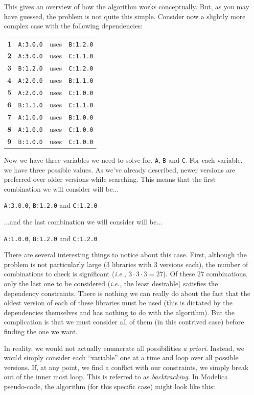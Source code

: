 \documentclass[11pt,a4paper,twocolumn]{article}
\renewcommand{\small}{\fontsize{9.5pt}{11.1pt}\selectfont}
\newcommand{\code}[1]{\texttt{#1}} %
\begin{document}
This gives an overview of how the algorithm works conceptually.  But,
as you may have guessed, the problem is not quite this simple.
Consider now a slightly more complex case with the following
dependencies:
{\small
\begin{center}
\begin{tabular}{llcl}
  \textbf{1} &\code{A:3.0.0} &uses &\code{B:1.2.0} \\
  \textbf{2} &\code{A:3.0.0} &uses &\code{C:1.1.0}\\
  \textbf{3} &\code{B:1.2.0} &uses &\code{C:1.2.0}\\
  \textbf{4} &\code{A:2.0.0} &uses &\code{B:1.1.0}\\
  \textbf{5} &\code{A:2.0.0} &uses &\code{C:1.0.0}\\
  \textbf{6} &\code{B:1.1.0} &uses &\code{C:1.1.0}\\
  \textbf{7} &\code{A:1.0.0} &uses &\code{B:1.0.0}\\
  \textbf{8} &\code{A:1.0.0} &uses &\code{C:1.0.0}\\
  \textbf{9} &\code{B:1.0.0} &uses &\code{C:1.0.0}
\end{tabular}
\end{center}
} Now we have three variables we need to solve for, \code{A}, \code{B}
and \code{C}.  For each variable, we have three possible values.  As
we've already described, newer versions are preferred over older
versions while searching.  This means that the first combination we
will consider will be...

\code{A:3.0.0}, \code{B:1.2.0} and \code{C:1.2.0}

...and the last combination we will consider will be...

\code{A:1.0.0}, \code{B:1.2.0} and \code{C:1.2.0}

There are several interesting things to notice about this case.
First, although the problem is not particularly large (3 libraries
with 3 versions each), the number of combinations to check is
significant (\emph{i.e.,} $3\cdot 3\cdot 3 = 27$).  Of these 27 combinations, only
the last one to be considered (\emph{i.e.,} the least desirable)
satisfies the dependency constraints.  There is nothing we can really
do about the fact that the oldest version of each of these libraries
must be used (this is dictated by the dependencies themselves and has
nothing to do with the algorithm).  But the complication is that we
must consider all of them (in this contrived case) before finding the
one we want.

In reality, we would not actually enumerate all possibilities
\emph{a priori}.  Instead, we would simply consider each ``variable'' one at
a time and loop over all possible versions.  If, at any point, we find
a conflict with our constraints, we simply break out of the inner most
loop.  This is referred to as \emph{backtracking}.  In Modelica
pseudo-code, the algorithm (for this specific case) might look like
this:
\end{document}
